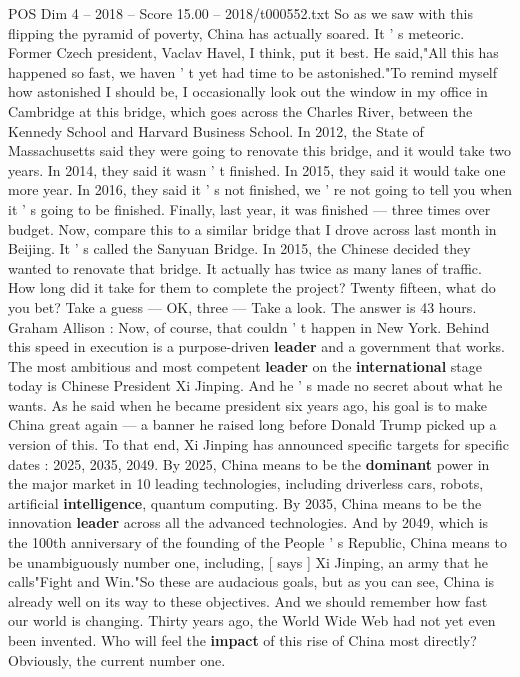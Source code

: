 \begin{textsample}{POS Dim 4 – 2018 – Score 15.00 – 2018/t000552.txt}
So as we saw with this flipping the pyramid of poverty, China has actually soared.
It ' s meteoric.
Former Czech president, Vaclav Havel, I think, put it best.
He said,"All this has happened so fast, we haven ' t yet had time to be astonished."To remind myself how astonished I should be, I occasionally look out the window in my office in Cambridge at this bridge, which goes across the Charles River, between the Kennedy School and Harvard Business School.
In 2012, the State of Massachusetts said they were going to renovate this bridge, and it would take two years.
In 2014, they said it wasn ' t finished.
In 2015, they said it would take one more year.
In 2016, they said it ' s not finished, we ' re not going to tell you when it ' s going to be finished.
Finally, last year, it was finished — three times over budget.
Now, compare this to a similar bridge that I drove across last month in Beijing.
It ' s called the Sanyuan Bridge.
In 2015, the Chinese decided they wanted to renovate that bridge.
It actually has twice as many lanes of traffic.
How long did it take for them to complete the project?
Twenty fifteen, what do you bet?
Take a guess — OK, three — Take a look.
The answer is 43 hours.
Graham Allison : Now, of course, that couldn ' t happen in New York.
Behind this speed in execution is a purpose-driven \textbf{leader} and a government that works.
The most ambitious and most competent \textbf{leader} on the \textbf{international} stage today is Chinese President Xi Jinping.
And he ' s made no secret about what he wants.
As he said when he became president six years ago, his goal is to make China great again — a banner he raised long before Donald Trump picked up a version of this.
To that end, Xi Jinping has announced specific targets for specific dates : 2025, 2035, 2049.
By 2025, China means to be the \textbf{dominant} power in the major market in 10 leading technologies, including driverless cars, robots, artificial \textbf{intelligence}, quantum computing.
By 2035, China means to be the innovation \textbf{leader} across all the advanced technologies.
And by 2049, which is the 100th anniversary of the founding of the People ' s Republic, China means to be unambiguously number one, including, [ says ] Xi Jinping, an army that he calls"Fight and Win."So these are audacious goals, but as you can see, China is already well on its way to these objectives.
And we should remember how fast our world is changing.
Thirty years ago, the World Wide Web had not yet even been invented.
Who will feel the \textbf{impact} of this rise of China most directly?
Obviously, the current number one.

\end{textsample}
